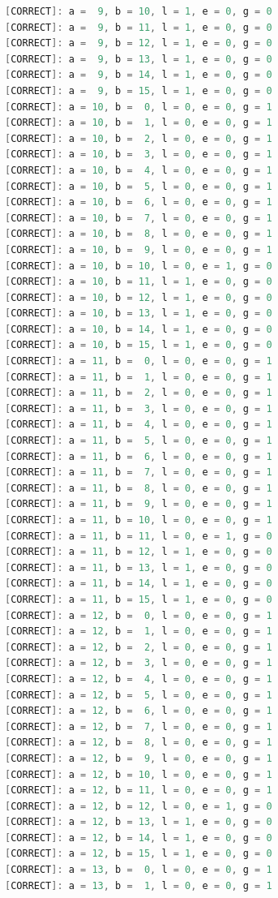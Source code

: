 \documentclass[12pt,onecolumn]{article}
\begin{document}
\begin{lstlisting}[style=verilog, language=Verilog]
[CORRECT]: a =  9, b = 10, l = 1, e = 0, g = 0
[CORRECT]: a =  9, b = 11, l = 1, e = 0, g = 0
[CORRECT]: a =  9, b = 12, l = 1, e = 0, g = 0
[CORRECT]: a =  9, b = 13, l = 1, e = 0, g = 0
[CORRECT]: a =  9, b = 14, l = 1, e = 0, g = 0
[CORRECT]: a =  9, b = 15, l = 1, e = 0, g = 0
[CORRECT]: a = 10, b =  0, l = 0, e = 0, g = 1
[CORRECT]: a = 10, b =  1, l = 0, e = 0, g = 1
[CORRECT]: a = 10, b =  2, l = 0, e = 0, g = 1
[CORRECT]: a = 10, b =  3, l = 0, e = 0, g = 1
[CORRECT]: a = 10, b =  4, l = 0, e = 0, g = 1
[CORRECT]: a = 10, b =  5, l = 0, e = 0, g = 1
[CORRECT]: a = 10, b =  6, l = 0, e = 0, g = 1
[CORRECT]: a = 10, b =  7, l = 0, e = 0, g = 1
[CORRECT]: a = 10, b =  8, l = 0, e = 0, g = 1
[CORRECT]: a = 10, b =  9, l = 0, e = 0, g = 1
[CORRECT]: a = 10, b = 10, l = 0, e = 1, g = 0
[CORRECT]: a = 10, b = 11, l = 1, e = 0, g = 0
[CORRECT]: a = 10, b = 12, l = 1, e = 0, g = 0
[CORRECT]: a = 10, b = 13, l = 1, e = 0, g = 0
[CORRECT]: a = 10, b = 14, l = 1, e = 0, g = 0
[CORRECT]: a = 10, b = 15, l = 1, e = 0, g = 0
[CORRECT]: a = 11, b =  0, l = 0, e = 0, g = 1
[CORRECT]: a = 11, b =  1, l = 0, e = 0, g = 1
[CORRECT]: a = 11, b =  2, l = 0, e = 0, g = 1
[CORRECT]: a = 11, b =  3, l = 0, e = 0, g = 1
[CORRECT]: a = 11, b =  4, l = 0, e = 0, g = 1
[CORRECT]: a = 11, b =  5, l = 0, e = 0, g = 1
[CORRECT]: a = 11, b =  6, l = 0, e = 0, g = 1
[CORRECT]: a = 11, b =  7, l = 0, e = 0, g = 1
[CORRECT]: a = 11, b =  8, l = 0, e = 0, g = 1
[CORRECT]: a = 11, b =  9, l = 0, e = 0, g = 1
[CORRECT]: a = 11, b = 10, l = 0, e = 0, g = 1
[CORRECT]: a = 11, b = 11, l = 0, e = 1, g = 0
[CORRECT]: a = 11, b = 12, l = 1, e = 0, g = 0
[CORRECT]: a = 11, b = 13, l = 1, e = 0, g = 0
[CORRECT]: a = 11, b = 14, l = 1, e = 0, g = 0
[CORRECT]: a = 11, b = 15, l = 1, e = 0, g = 0
[CORRECT]: a = 12, b =  0, l = 0, e = 0, g = 1
[CORRECT]: a = 12, b =  1, l = 0, e = 0, g = 1
[CORRECT]: a = 12, b =  2, l = 0, e = 0, g = 1
[CORRECT]: a = 12, b =  3, l = 0, e = 0, g = 1
[CORRECT]: a = 12, b =  4, l = 0, e = 0, g = 1
[CORRECT]: a = 12, b =  5, l = 0, e = 0, g = 1
[CORRECT]: a = 12, b =  6, l = 0, e = 0, g = 1
[CORRECT]: a = 12, b =  7, l = 0, e = 0, g = 1
[CORRECT]: a = 12, b =  8, l = 0, e = 0, g = 1
[CORRECT]: a = 12, b =  9, l = 0, e = 0, g = 1
[CORRECT]: a = 12, b = 10, l = 0, e = 0, g = 1
[CORRECT]: a = 12, b = 11, l = 0, e = 0, g = 1
[CORRECT]: a = 12, b = 12, l = 0, e = 1, g = 0
[CORRECT]: a = 12, b = 13, l = 1, e = 0, g = 0
[CORRECT]: a = 12, b = 14, l = 1, e = 0, g = 0
[CORRECT]: a = 12, b = 15, l = 1, e = 0, g = 0
[CORRECT]: a = 13, b =  0, l = 0, e = 0, g = 1
[CORRECT]: a = 13, b =  1, l = 0, e = 0, g = 1

\end{lstlisting}
\end{document}
